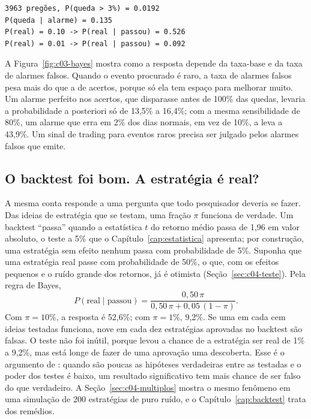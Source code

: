 
\begin{lstlisting}[style=saida]
3963 pregões, P(queda > 3%) = 0.0192
P(queda | alarme) = 0.135
P(real) = 0.10 -> P(real | passou) = 0.526
P(real) = 0.01 -> P(real | passou) = 0.092
\end{lstlisting}

A Figura~\ref{fig:c03-bayes} mostra como a resposta depende da taxa-base e da taxa de alarmes falsos. Quando o evento procurado é raro, a taxa de alarmes falsos pesa mais do que a de acertos, porque só ela tem espaço para melhorar muito. Um alarme perfeito nos acertos, que disparasse antes de 100\% das quedas, levaria a probabilidade a posteriori só de 13,5\% a 16,4\%; com a mesma sensibilidade de 80\%, um alarme que erra em 2\% dos dias normais, em vez de 10\%, a leva a 43,9\%. Um sinal de trading para eventos raros precisa ser julgado pelos alarmes falsos que emite.


\subsection{O backtest foi bom. A estratégia é real?}

A mesma conta responde a uma pergunta que todo pesquisador deveria se fazer. Das ideias de estratégia que se testam, uma fração $\pi$ funciona de verdade. Um backtest ``passa'' quando a estatística $t$ do retorno médio passa de 1,96 em valor absoluto, o teste a 5\% que o Capítulo~\ref{cap:estatistica} apresenta; por construção, uma estratégia sem efeito nenhum passa com probabilidade de 5\%. Suponha que uma estratégia real passe com probabilidade de 50\%, o que, com os efeitos pequenos e o ruído grande dos retornos, já é otimista (Seção~\ref{sec:c04-teste}). Pela regra de Bayes,
\begin{equation*}
  P(\text{real} \mid \text{passou}) = \frac{0,50\,\pi}{0,50\,\pi + 0,05\,(1-\pi)} .
\end{equation*}
Com $\pi = 10\%$, a resposta é 52,6\%; com $\pi = 1\%$, 9,2\%. Se uma em cada cem ideias testadas funciona, nove em cada dez estratégias aprovadas no backtest são falsas. O teste não foi inútil, porque levou a chance de a estratégia ser real de 1\% a 9,2\%, mas está longe de fazer de uma aprovação uma descoberta. Esse é o argumento de \citet{ioannidis2005}: quando são poucas as hipóteses verdadeiras entre as testadas e o poder dos testes é baixo, um resultado significativo tem mais chance de ser falso do que verdadeiro. A Seção~\ref{sec:c04-multiplos} mostra o mesmo fenômeno em uma simulação de 200 estratégias de puro ruído, e o Capítulo~\ref{cap:backtest} trata dos remédios.

